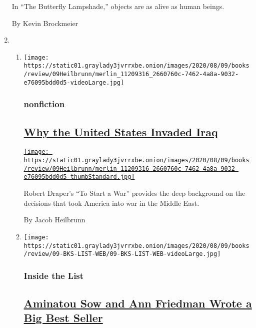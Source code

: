 \begin{enumerate}
  In ``The Butterfly Lampshade,'' objects are as alive as human beings.

  By Kevin Brockmeier
\item
  \begin{enumerate}
  \def\labelenumii{\arabic{enumii}.}
  \item
    \texttt{[image: https://static01.graylady3jvrrxbe.onion/images/2020/08/09/books/review/09Heilbrunn/merlin\_11209316\_2660760c-7462-4a8a-9032-e76095bdd0d5-videoLarge.jpg]}

    \hypertarget{nonfiction-1}{%
    \subsubsection{nonfiction}\label{nonfiction-1}}

    \hypertarget{why-the-united-states-invaded-iraq}{%
    \subsection{\texorpdfstring{\href{/2020/07/28/books/review/to-start-a-war-robert-draper.html}{Why
    the United States Invaded
    Iraq}}{Why the United States Invaded Iraq}}\label{why-the-united-states-invaded-iraq}}

    \href{/2020/07/28/books/review/to-start-a-war-robert-draper.html}{\texttt{[image: https://static01.graylady3jvrrxbe.onion/images/2020/08/09/books/review/09Heilbrunn/merlin\_11209316\_2660760c-7462-4a8a-9032-e76095bdd0d5-thumbStandard.jpg]}}

    Robert Draper's ``To Start a War'' provides the deep background on
    the decisions that took America into war in the Middle East.

    By Jacob Heilbrunn
  \item
    \texttt{[image: https://static01.graylady3jvrrxbe.onion/images/2020/08/09/books/review/09-BKS-LIST-WEB/09-BKS-LIST-WEB-videoLarge.jpg]}

    \hypertarget{inside-the-list}{%
    \subsubsection{Inside the List}\label{inside-the-list}}

    \hypertarget{aminatou-sow-and-ann-friedman-wrote-a-big-best-seller}{%
    \subsection{\texorpdfstring{\href{/2020/07/30/books/review/aminatou-sow-ann-friedman-big-friendship.html}{Aminatou
    Sow and Ann Friedman Wrote a Big Best
    Seller}}{Aminatou Sow and Ann Friedman Wrote a Big Best Seller}}\label{aminatou-sow-and-ann-friedman-wrote-a-big-best-seller}}


\end{enumerate}
\end{enumerate}
